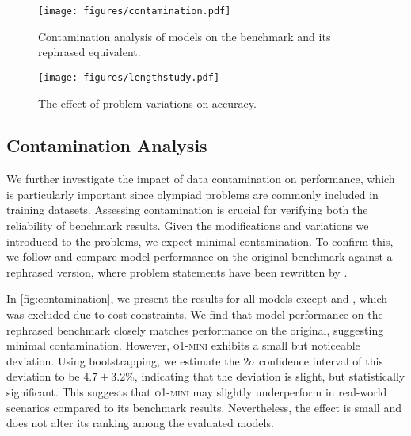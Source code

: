
\begin{figure*}[t]
  \centering
  \begin{minipage}[t]{0.46\textwidth}
    \centering
    \texttt{[image: figures/contamination.pdf]}
    \caption{Contamination analysis of models on the benchmark and its rephrased equivalent.}
    \label{fig:contamination}
  \end{minipage}
  \hfill
  \begin{minipage}[t]{0.46\textwidth}
      \centering
      \texttt{[image: figures/lengthstudy.pdf]}
      \caption{The effect of problem variations on accuracy.}
      \label{fig:length}
  \end{minipage}
\end{figure*}


\subsection{Contamination Analysis} \label{sec:contamination}
We further investigate the impact of data contamination on performance, which is particularly important since olympiad problems are commonly included in training datasets. Assessing contamination is crucial for verifying both the reliability of benchmark results. Given the modifications and variations we introduced to the problems, we expect minimal contamination. To confirm this, we follow \citet{constat} and compare model performance on the original benchmark against a rephrased version, where problem statements have been rewritten by \gptfo{}. 

In \cref{fig:contamination}, we present the results for all models except \oone{} and \othree{}, which was excluded due to cost constraints. We find that model performance on the rephrased benchmark closely matches performance on the original, suggesting minimal contamination. However, \textsc{o1-mini} exhibits a small but noticeable deviation. Using bootstrapping, we estimate the $2\sigma$ confidence interval of this deviation to be $4.7 \pm 3.2\%$, indicating that the deviation is slight, but statistically significant. This suggests that \textsc{o1-mini} may slightly underperform in real-world scenarios compared to its benchmark results. Nevertheless, the effect is small and does not alter its ranking among the evaluated models.

